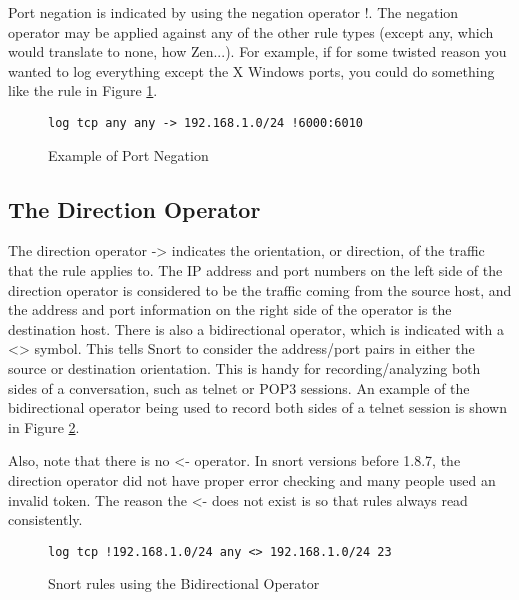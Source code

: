 \documentclass[english]{report}
\begin{document}
Port negation is indicated by using the negation operator !.
The negation operator may be applied against any of the other rule
types (except any, which would translate to none, how Zen...). For
example, if for some twisted reason you wanted to log everything except
the X Windows ports, you could do something like the rule in Figure
\ref{example port negation}.

%
\begin{figure}[!hbpt]
\begin{verbatim}
log tcp any any -> 192.168.1.0/24 !6000:6010
\end{verbatim}

\caption{\label{example port negation}Example of Port Negation}
\end{figure}



\subsection{The Direction Operator}

The direction operator -> indicates the orientation,
or direction, of the traffic that the rule applies
to. The IP address and port numbers on the left side of the direction
operator is considered to be the traffic coming from the source host,
and the address and port information on the right side of the operator
is the destination host. There is also a bidirectional operator, which
is indicated with a <> symbol. This tells Snort
to consider the address/port pairs in either the source or destination
orientation. This is handy for recording/analyzing both sides of a
conversation, such as telnet or POP3 sessions. An example of the bidirectional
operator being used to record both sides of a telnet session is shown
in Figure \ref{bidirectional operator}.

Also, note that there is no <- operator. In snort
versions before 1.8.7, the direction operator did not have proper
error checking and many people used an invalid token. The reason the
<- does not exist is so that rules always read
consistently.

%
\begin{figure}[!hbpt]
\begin{verbatim}
log tcp !192.168.1.0/24 any <> 192.168.1.0/24 23
\end{verbatim}

\caption{\label{bidirectional operator}Snort rules using the Bidirectional
Operator}
\end{figure}
\end{document}
